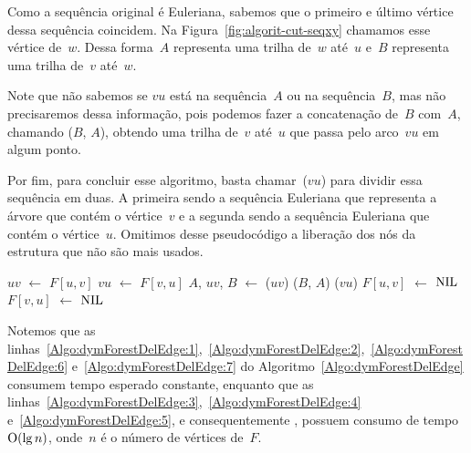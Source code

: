 Como a sequência original é Euleriana, sabemos que o primeiro e último vértice dessa sequência coincidem. Na Figura~\ref{fig:algorit-cut-seqxy} chamamos esse vértice de~$w$.
Dessa forma~$A$ representa uma trilha de~$w$ até~$u$ e~$B$ representa uma trilha de~$v$ até~$w$.

Note que não sabemos se $vu$ está na sequência~$A$ ou na sequência~$B$, mas não precisaremos dessa informação, pois podemos fazer a concatenação de~$B$ com~$A$,
chamando \treapJoin($B$, $A$), obtendo uma trilha de~$v$ até~$u$ que passa pelo arco~$vu$ em algum ponto.

Por fim, para concluir esse algoritmo, basta chamar~\treapSplit($vu$) para dividir essa sequência em duas.
A primeira sendo a sequência Euleriana que representa a árvore que contém o vértice~$v$ e a segunda sendo a sequência Euleriana que contém o vértice~$u$.
Omitimos desse pseudocódigo a liberação dos nós da estrutura que não são mais usados.

\begin{algorithm}[htb]
\caption{\dymForestDelEdge($F$, $u$, $v$)}
\label{Algo:dymForestDelEdge}
\begin{algorithmic}[1]
\State $uv$ $\gets$ $F[u,v]$\label{Algo:dymForestDelEdge:1}
\State $vu$ $\gets$ $F[v,u]$\label{Algo:dymForestDelEdge:2}
\State $A$, $uv$, $B$ $\gets$ \treapSplit($uv$)\label{Algo:dymForestDelEdge:3}
\State \treapJoin($B$, $A$)\label{Algo:dymForestDelEdge:4}
\State \treapSplit($vu$)\label{Algo:dymForestDelEdge:5}
\State $F[u,v]$ $\gets$ $\text{NIL}{}$\label{Algo:dymForestDelEdge:6}
\State $F[v,u]$ $\gets$ $\text{NIL}{}$\label{Algo:dymForestDelEdge:7}
\end{algorithmic}
\end{algorithm}

Notemos que as linhas~\ref{Algo:dymForestDelEdge:1},~\ref{Algo:dymForestDelEdge:2},~\ref{Algo:dymForestDelEdge:6} e~\ref{Algo:dymForestDelEdge:7} do Algoritmo~\ref{Algo:dymForestDelEdge} consumem tempo esperado constante, enquanto que as linhas~\ref{Algo:dymForestDelEdge:3},~\ref{Algo:dymForestDelEdge:4} e~\ref{Algo:dymForestDelEdge:5}, e consequentemente \dymForestDelEdge{}, possuem consumo de tempo~$\mathrm{O}(\lg n)$, onde~$n$ é o número de vértices de~$F$.

